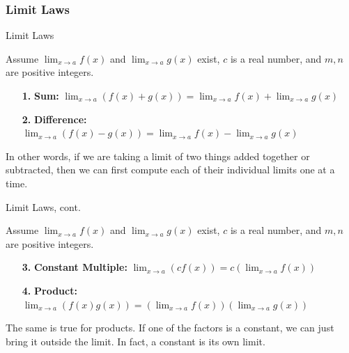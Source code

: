 \documentclass[cal1spr16Lectures.tex]{subfiles}
\begin{document}
\subsubsection{Limit Laws}
\begin{frame}{\small Limit Laws}{}
{\footnotesize Assume $\lim_{x \to a} f(x)$ and $\lim_{x \to a} g(x)$ exist, $c$ is a real number, and $m,n$ are positive integers.

\hrulefill
}
\begin{itemize}
\item[{\bf 1.}] {\bf Sum:} $\lim_{x \to a}\left(f(x)+g(x)\right) = \lim_{x \to a} f(x)+\lim_{x \to a} g(x)$

\vspace{1pc}
\item[{\bf 2.}] {\bf Difference:} $\lim_{x \to a}\left(f(x)-g(x)\right) = \lim_{x \to a} f(x)-\lim_{x \to a} g(x)$
\end{itemize}

\vspace{1.25pc}In other words, if we are taking a limit of two things added together or subtracted, then we can first compute each of their individual limits one at a time.
\end{frame}

\begin{frame}{\small Limit Laws, cont.}{}
{\footnotesize Assume $\lim_{x \to a} f(x)$ and $\lim_{x \to a} g(x)$ exist, $c$ is a real number, and $m,n$ are positive integers.

\hrulefill
}
\begin{itemize}
\item[{\bf 3.}] {\bf Constant Multiple:} $\lim_{x \to a}\left(cf(x)\right) = c\left(\lim_{x \to a}f(x)\right)$

\vspace{1pc}
\item[{\bf 4.}] {\bf Product:}  $\lim_{x \to a}\left(f(x)g(x)\right) = \left(\lim_{x \to a} f(x)\right) \left(\lim_{x \to a} g(x)\right)$
\end{itemize}

\vspace{1.25pc}
The same is true for products.  If one of the factors is a constant, we can just bring it outside the limit.  In fact, a constant is its own limit.
\end{frame}
\end{document}
